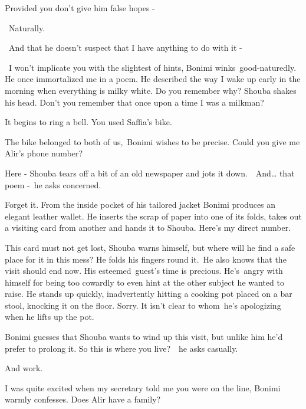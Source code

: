 \documentclass[twoside,11pt]{book}
\begin{document}
{\textquotedbl}Provided you don't give him false hopes -{\textquotedbl}

~{\textquotedbl}Naturally.{\textquotedbl}

~{\textquotedbl}And that he doesn't suspect that I have anything to do with it -{\textquotedbl}

~{\textquotedbl}I won't implicate you with the slightest of hints,{\textquotedbl} Bonimi winks\ good-naturedly.
{\textquotedbl}He once immortalized me in a poem. He described the way I wake up early in the morning when everything
is milky white. Do you remember why?{\textquotedbl} Shouba shakes his head. {\textquotedbl}Don't you remember that once
upon a time I was a milkman?{\textquotedbl}

{\textquotedbl}It begins to ring a bell. You used Saffia's bike.{\textquotedbl}

{\textquotedbl}The bike belonged to both of us,{\textquotedbl}\ Bonimi wishes to be precise. {\textquotedbl}Could you
give me Alir's phone number?{\textquotedbl}

{\textquotedbl}Here -{\textquotedbl} Shouba tears off {a bit of an }old newspaper and jots it
down.\ \ {\textquotedbl}And{\dots} that poem -{\textquotedbl}\ he asks concerned.

{\textquotedbl}Forget it.{\textquotedbl} From the inside pocket of his tailored jacket Bonimi produces an elegant
leather wallet. He inserts the scrap of paper into one of its folds, takes out a visiting card from another and hands
it to Shouba. {\textquotedbl}Here's my direct number.{\textquotedbl}

This card must not get lost, Shouba warns himself, but where will he find a safe place for it in this mess? He folds his
fingers round it.\ He also knows that the visit should end now. His esteemed~guest's time is precious.
He's{\ }angry with himself for being too cowardly to even hint at the other
subject he wanted to raise. He stands up quickly, inadvertently hitting a cooking pot placed on a bar stool, knocking
it on the floor. {\textquotedbl}Sorry.{\textquotedbl} It isn't clear to whom\ he's apologizing when he lifts up the
pot.

Bonimi guesses that Shouba wants to wind up this visit, but unlike him he'd prefer to prolong it. {\textquotedbl}So this
is where you live?{\textquotedbl}\ \ he asks casually. 

{\textquotedbl}And work.{\textquotedbl}

{\textquotedbl}I was quite excited when my secretary told me you were on the line,{\textquotedbl} Bonimi warmly
confesses. {\textquotedbl}Does Alir have a family?{\textquotedbl}
\end{document}
